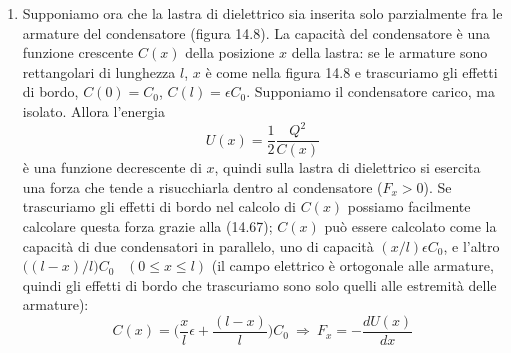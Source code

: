 \begin{enumerate}
    opposto a quello dato dalla (14.69) e quindi una forza repulsiva fra le
    armature. L'errore consiste nel dimenticare che ora il condensatore non \`e
    un sistema isolato, quindi la variazione della sua energia per lo
    spostamento di un'armatura non \`e solo data da $-F_z\Delta z$, ma anche dal
    lavoro $V\Delta Q$ fatto dalla batteria per mantenere costante la
    d.d.p.\ mentre la capacit\`a varia a causa della variazione della distanza
    fra le armature. Si ha
    \begin{equation}
      \Delta U=-F_z\Delta z+V\Delta Q
      \tag{14.70}
    \end{equation}
    dove $\Delta Q$ \`e la carica trasferita dalla batteria. Siccome $Q=VC$ e il
    potenziale resta costante, $\Delta Q=V\Delta C$ e si ha
    \begin{equation}
      F_z=-\frac{dU}{dz}+V^2\frac{dC}{dz}=-\frac{1}{2}V^2\frac{dC}{dz}
      +V^2\frac{dC}{dz}=+\frac{1}{2}V^2\frac{dC}{dz}
      \tag{14.71}
    \end{equation}
    e ora si ritrova la (14.68), con il segno giusto.
  \item Supponiamo ora che la lastra di dielettrico sia inserita solo
    parzialmente fra le armature del condensatore (figura 14.8). La capacit\`a
    del condensatore \`e una funzione crescente $C(x)$ della posizione $x$ della
    lastra: se le armature sono rettangolari di lunghezza $l$, $x$ \`e come
    nella figura 14.8 e trascuriamo gli effetti di bordo, $C(0)=C_0$,
    $C(l)=\epsilon C_0$. Supponiamo il condensatore carico, ma isolato. Allora
    l'energia
    \begin{equation}
      U(x)=\frac{1}{2}\frac{Q^2}{C(x)}
      \tag{14.72}
    \end{equation}
    \`e una funzione decrescente di $x$, quindi sulla lastra di dielettrico si
    esercita una forza che tende a risucchiarla dentro al condensatore
    ($F_x>0$). Se trascuriamo gli effetti di bordo nel calcolo di $C(x)$
    possiamo facilmente calcolare questa forza grazie alla (14.67); $C(x)$ pu\`o
    essere calcolato come la capacit\`a di due condensatori in parallelo, uno di
    capacit\`a $(x/l)\epsilon C_0$, e l'altro $\big((l-x)/l\big)C_0$
    \ $(0\le x\le l)$ (il campo elettrico \`e ortogonale alle armature, quindi
    gli effetti di bordo che trascuriamo sono solo quelli alle estremit\`a delle
    armature):
    \begin{equation}
      C(x)=\Big(\frac{x}{l}\epsilon+\frac{(l-x)}{l}\Big)C_0
      \ \Rightarrow\ F_x=-\frac{dU(x)}{dx}

\end{equation}
\end{enumerate}
